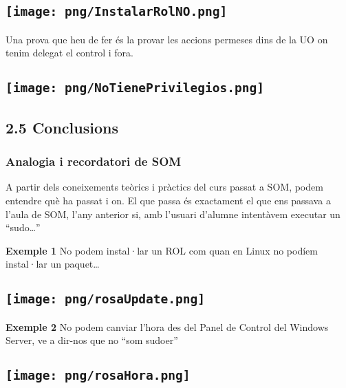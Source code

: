 \documentclass[
  a4paper,
]{article}
\begin{document}
\subsection{\texorpdfstring{\protect\texttt{[image: png/InstalarRolNO.png]}}{Figura 10: Instal·lar ROL}}\label{figura-10-installar-rol}

Una prova que heu de fer és la provar les accions permeses dins de la UO
on tenim delegat el control i fora.

\subsection{\texorpdfstring{\protect\texttt{[image: png/NoTienePrivilegios.png]}}{Figura 11: Accions permeses però fora de la UO}}\label{figura-11-accions-permeses-peruxf2-fora-de-la-uo}

\subsection{2.5 Conclusions}\label{conclusions}

\subsubsection{Analogia i recordatori de
SOM}\label{analogia-i-recordatori-de-som}

A partir dels coneixements teòrics i pràctics del curs passat a SOM,
podem entendre què ha passat i on. El que passa és exactament el que ens
passava a l'aula de SOM, l'any anterior si, amb l'usuari d'alumne
intentàvem executar un ``sudo\ldots{}''

\textbf{Exemple 1} No podem instal·lar un ROL com quan en Linux no
podíem instal·lar un paquet\ldots{}

\subsection{\texorpdfstring{\protect\texttt{[image: png/rosaUpdate.png]}}{Figura 12: Eines per instal·lar apt}}\label{figura-12-eines-per-installar-apt}

\textbf{Exemple 2} No podem canviar l'hora des del Panel de Control del
Windows Server, ve a dir-nos que no ``som sudoer''

\subsection{\texorpdfstring{\protect\texttt{[image: png/rosaHora.png]}}{Figura 13: Canvi de data}}\label{figura-13-canvi-de-data}
\end{document}

